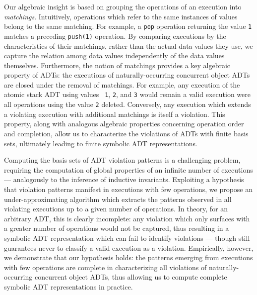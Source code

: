 Our algebraic insight is based on grouping the operations of an execution into
\emph{matchings}. Intuitively, operations which refer to the same instances of
values belong to the same matching. For example, a {\tt pop} operation
returning the value {\tt 1} matches a preceding {\tt push(1)} operation. By
comparing executions by the characteristics of their matchings, rather than the
actual data values they use, we capture the relation among data values
independently of the data values themselves. Furthermore, the notion of
matchings provides a key algebraic property of ADTs: the executions of
naturally-occurring concurrent object ADTs are closed under the removal of
matchings. For example, any execution of the atomic stack ADT using values {\tt
1}, {\tt 2}, and {\tt 3} would remain a valid execution were all operations
using the value {\tt 2} deleted. Conversely, any execution which extends a
violating execution with additional matchings is itself a violation. This
property, along with analogous algebraic properties concerning operation order
and completion, allow us to characterize the violations of ADTs with finite
basis sets, ultimately leading to finite symbolic ADT representations.

Computing the basis sets of ADT violation patterns is a challenging problem,
requiring the computation of global properties of an infinite number of
executions — analogously to the inference of inductive invariants. Exploiting a
hypothesis that violation patterns manifest in executions with few operations,
we propose an under-approximating algorithm which extracts the patterns
observed in all violating executions up to a given number of operations. In
theory, for an arbitrary ADT, this is clearly incomplete: any violation which
only surfaces with a greater number of operations would not be captured, thus
resulting in a symbolic ADT representation which can fail to identify
violations — though still guarantees never to classify a valid execution as a
violation. Empirically, however, we demonstrate that our hypothesis holds: the
patterns emerging from executions with few operations are complete in
characterizing all violations of naturally-occurring concurrent object ADTs,
thus allowing us to compute complete symbolic ADT representations in practice.

